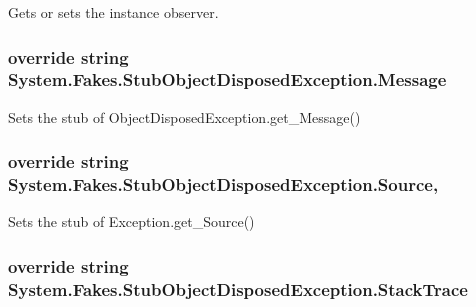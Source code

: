 Gets or sets the instance observer.

\hypertarget{class_system_1_1_fakes_1_1_stub_object_disposed_exception_affc04d881945745bc9574b258177152e}{
\subsubsection[{Message}]{\setlength{\rightskip}{0pt plus 5cm}override string System.\-Fakes.\-Stub\-Object\-Disposed\-Exception.\-Message\hspace{0.3cm}{\ttfamily [get]}}}\label{class_system_1_1_fakes_1_1_stub_object_disposed_exception_affc04d881945745bc9574b258177152e}


Sets the stub of Object\-Disposed\-Exception.\-get\-\_\-\-Message()

\hypertarget{class_system_1_1_fakes_1_1_stub_object_disposed_exception_a0deeb7d924fa86b7b2199df7bcdaeb90}{
\subsubsection[{Source}]{\setlength{\rightskip}{0pt plus 5cm}override string System.\-Fakes.\-Stub\-Object\-Disposed\-Exception.\-Source\hspace{0.3cm}{\ttfamily [get]}, {\ttfamily [set]}}}\label{class_system_1_1_fakes_1_1_stub_object_disposed_exception_a0deeb7d924fa86b7b2199df7bcdaeb90}


Sets the stub of Exception.\-get\-\_\-\-Source()

\hypertarget{class_system_1_1_fakes_1_1_stub_object_disposed_exception_a3133d41f6cf23fdbf8f8530b388150c8}{
\subsubsection[{Stack\-Trace}]{\setlength{\rightskip}{0pt plus 5cm}override string System.\-Fakes.\-Stub\-Object\-Disposed\-Exception.\-Stack\-Trace\hspace{0.3cm}{\ttfamily [get]}}}\label{class_system_1_1_fakes_1_1_stub_object_disposed_exception_a3133d41f6cf23fdbf8f8530b388150c8}


